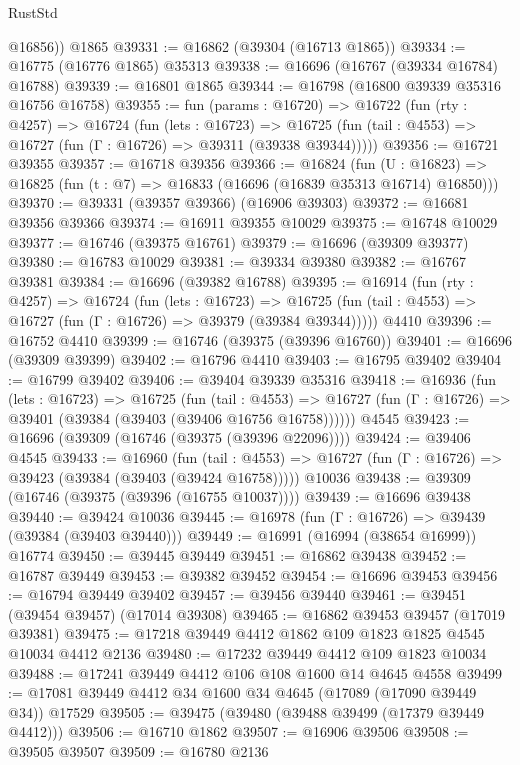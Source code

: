 \begin{lexlean}{RustStd}
\begin{coremodule}
        @16856))
    @1865
@39331 := @16862 (@39304 (@16713 @1865))
@39334 := @16775 (@16776 @1865) @35313
@39338 := @16696 (@16767 (@39334 @16784) @16788)
@39339 := @16801 @1865
@39344 := @16798 (@16800 @39339 @35316 @16756 @16758)
@39355 := fun (params : @16720) =>
  @16722
    (fun (rty : @4257) =>
    @16724
      (fun (lets : @16723) =>
      @16725 (fun (tail : @4553) => @16727 (fun (Γ : @16726) => @39311 (@39338 @39344)))))
@39356 := @16721 @39355
@39357 := @16718 @39356
@39366 := @16824
    (fun (U : @16823) => @16825 (fun (t : @7) => @16833 (@16696 (@16839 @35313 @16714) @16850)))
@39370 := @39331 (@39357 @39366) (@16906 @39303)
@39372 := @16681 @39356 @39366
@39374 := @16911 @39355 @10029
@39375 := @16748 @10029
@39377 := @16746 (@39375 @16761)
@39379 := @16696 (@39309 @39377)
@39380 := @16783 @10029
@39381 := @39334 @39380
@39382 := @16767 @39381
@39384 := @16696 (@39382 @16788)
@39395 := @16914
    (fun (rty : @4257) =>
    @16724
      (fun (lets : @16723) =>
      @16725 (fun (tail : @4553) => @16727 (fun (Γ : @16726) => @39379 (@39384 @39344)))))
    @4410
@39396 := @16752 @4410
@39399 := @16746 (@39375 (@39396 @16760))
@39401 := @16696 (@39309 @39399)
@39402 := @16796 @4410
@39403 := @16795 @39402
@39404 := @16799 @39402
@39406 := @39404 @39339 @35316
@39418 := @16936
    (fun (lets : @16723) =>
    @16725
      (fun (tail : @4553) =>
      @16727 (fun (Γ : @16726) => @39401 (@39384 (@39403 (@39406 @16756 @16758))))))
    @4545
@39423 := @16696 (@39309 (@16746 (@39375 (@39396 @22096))))
@39424 := @39406 @4545
@39433 := @16960
    (fun (tail : @4553) => @16727 (fun (Γ : @16726) => @39423 (@39384 (@39403 (@39424 @16758)))))
    @10036
@39438 := @39309 (@16746 (@39375 (@39396 (@16755 @10037))))
@39439 := @16696 @39438
@39440 := @39424 @10036
@39445 := @16978 (fun (Γ : @16726) => @39439 (@39384 (@39403 @39440)))
@39449 := @16991 (@16994 (@38654 @16999)) @16774
@39450 := @39445 @39449
@39451 := @16862 @39438
@39452 := @16787 @39449
@39453 := @39382 @39452
@39454 := @16696 @39453
@39456 := @16794 @39449 @39402
@39457 := @39456 @39440
@39461 := @39451 (@39454 @39457) (@17014 @39308)
@39465 := @16862 @39453 @39457 (@17019 @39381)
@39475 := @17218 @39449 @4412 @1862 @109 @1823 @1825 @4545 @10034 @4412 @2136
@39480 := @17232 @39449 @4412 @109 @1823 @10034
@39488 := @17241 @39449 @4412 @106 @108 @1600 @14 @4645 @4558
@39499 := @17081 @39449 @4412 @34 @1600 @34 @4645 (@17089 (@17090 @39449 @34)) @17529
@39505 := @39475 (@39480 (@39488 @39499 (@17379 @39449 @4412)))
@39506 := @16710 @1862
@39507 := @16906 @39506
@39508 := @39505 @39507
@39509 := @16780 @2136

\end{coremodule}
\end{lexlean}
